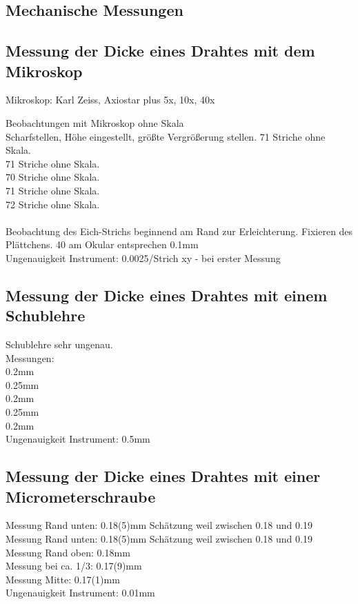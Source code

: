 \documentclass[12pt,a4paper]{article}
\begin{document}
\begin{multicols}{2}
\section{Mechanische Messungen}
\subsection{Messung der Dicke eines Drahtes mit dem Mikroskop} 

Mikroskop: Karl Zeiss, Axiostar plus 5x, 10x, 40x 

Beobachtungen mit Mikroskop ohne Skala\\
Scharfstellen, Höhe eingestellt, größte Vergrößerung stellen.
71 Striche ohne Skala.\\
71 Striche ohne Skala.\\
70 Striche ohne Skala.\\
71 Striche ohne Skala.\\
72 Striche ohne Skala.\\
\\
Beobachtung des Eich-Strichs beginnend am Rand zur Erleichterung. Fixieren des Plättchens. 
40 am Okular entsprechen 0.1mm\\
Ungenauigkeit Instrument: 0.0025/Strich
xy - bei erster Messung\\

\subsection{Messung der Dicke eines Drahtes mit einem Schublehre}
Schublehre sehr ungenau. \\
Messungen: \\
0.2mm\\
0.25mm\\
0.2mm\\
0.25mm\\
0.2mm\\
Ungenauigkeit Instrument: 0.5mm

\subsection{Messung der Dicke eines Drahtes mit einer Micrometerschraube}
Messung Rand unten: 0.18(5)mm Schätzung weil zwischen 0.18 und 0.19 \\
Messung Rand unten: 0.18(5)mm Schätzung weil zwischen 0.18 und 0.19 \\
Messung Rand oben: 0.18mm\\
Messung bei ca. 1/3: 0.17(9)mm\\
Messung Mitte: 0.17(1)mm\\
Ungenauigkeit Instrument: 0.01mm


\end{multicols}
\end{document}
